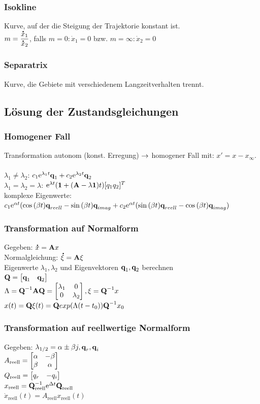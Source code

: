\documentclass[fs, footer]{latex4ei}
\begin{document}
\begin{multicols*}{4}
		\subsubsection{Isokline}
		Kurve, auf der die Steigung der Trajektorie konstant ist.\\
		$m = \dfrac {\accentset{\mbox{\textrm{\large\bfseries .}} }{x}_1}{\accentset{\mbox{\textrm{\large\bfseries .}} }{x}_2}$, falls $m = 0: \dot x_1 = 0$ bzw. $m = \infty: \dot x_2 = 0$
		\subsubsection{Separatrix}
		Kurve, die Gebiete mit verschiedenem Langzeitverhalten trennt.
	\subsection{Lösung der Zustandsgleichungen}
		\subsubsection{Homogener Fall}
		Transformation autonom (konst. Erregung) $\rightarrow$ homogener Fall mit: $x' = x - x_\infty$.\\ \\
		$\lambda_1 \neq \lambda_2$: $c_1\mathrm{e}^{\lambda_1t}\textbf{q}_1 + c_2\mathrm{e}^{\lambda_2t}\textbf{q}_2$\\
		$\lambda_1 = \lambda_2 = \lambda$: $\mathrm{e}^{\lambda t}(\textbf{1} + (\textbf{A} -\lambda \textbf{1})t) [q_1 q_2]^T$\\
		komplexe Eigenwerte: $c_1 \mathrm{e}^{\alpha t}(\cos{(\beta t)}\textbf{q}_{reell} - \sin{(\beta t)}\textbf{q}_{imag} + c_2\mathrm{e}^{\alpha t}(\sin{(\beta t)}\textbf{q}_{reell} - \cos{(\beta t)}\textbf{q}_{imag})$\\
		\subsubsection{Transformation auf Normalform}
		Gegeben: $\accentset{\mbox{\textrm{\large\bfseries .}} }{x} = \textbf{A} x$\\
		Normalgleichung: $\accentset{\mbox{\textrm{\large\bfseries .}} }{\xi} = \textbf{A}\xi$\\
		Eigenwerte $\lambda_1, \lambda_2$ und Eigenvektoren $\textbf{q}_1, \textbf{q}_2$ berechnen\\
		$\textbf{Q} =  \begin{bmatrix} \textbf{q}_1 & \textbf{q}_2  \end{bmatrix}$\\
		$\Lambda = \textbf{Q}^{-1}\textbf{A}\textbf{Q} = \begin{bmatrix} \lambda_1 & 0 \\ 0 & \lambda_2  \end{bmatrix}, \xi = \textbf{Q}^{-1} x$\\
		$x(t) = \textbf{Q} \xi(t) = \textbf{Q} exp(\Lambda(t-t_0))\textbf{Q}^{-1} x_0$\\
		\subsubsection{Transformation auf reellwertige Normalform}
		Gegeben: $\lambda_{1/2} = \alpha \pm \beta j, \textbf{q}_r, \textbf{q}_i$\\
		$A_\text{reell} =  \begin{bmatrix} \alpha & - \beta \\ \beta & \alpha \end{bmatrix}$\\
		$Q_\text{reell} = \begin{bmatrix}  q_r & - q_i \end{bmatrix}$\\
		$x_\text{reell} = \textbf{Q}_\text{reell}^{-1} \mathrm{e}^{\Delta t}\textbf{Q}_\text{reell}$\\
		$\dot{x}_\text{reell} (t) = A_\text{reell}x_\text{reell}(t)$\\ 

\end{multicols*}
\end{document}
